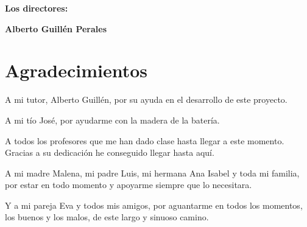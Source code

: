 \vspace{1cm}

\textbf{Los directores:}

\vspace{5cm}

\noindent \textbf{Alberto Guillén Perales}

\chapter*{Agradecimientos}
\thispagestyle{empty}

    \vspace{1cm}

A mi tutor, Alberto Guillén, por su ayuda en el desarrollo de este proyecto.

A mi tío José, por ayudarme con la madera de la batería.

A todos los profesores que me han dado clase hasta llegar a este momento. Gracias a su dedicación he conseguido llegar
hasta aquí.

A mi madre Malena, mi padre Luis, mi hermana Ana Isabel y toda mi familia, por estar en todo momento y apoyarme siempre
que lo necesitara.

Y a mi pareja Eva y todos mis amigos, por aguantarme en todos los momentos, los buenos y los malos, de este largo y
sinuoso camino.
